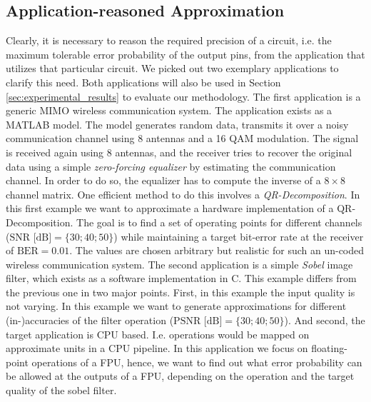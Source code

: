 \documentclass[conference]{IEEEtran}
\begin{document}
\subsection{Application-reasoned Approximation}
\label{subsec:application_reasoned}
Clearly, it is necessary to reason the required precision of a circuit, i.e. the maximum tolerable error probability of the output pins, from the application that utilizes that particular circuit. We picked out two exemplary applications to clarify this need. Both applications will also be used in Section \ref{sec:experimental_results} to evaluate our methodology. The first application is a generic MIMO wireless communication system. The application exists as a MATLAB model. The model generates random data, transmits it over a noisy communication channel using 8 antennas and a 16 QAM modulation. The signal is received again using 8 antennas, and the receiver tries to recover the original data using a simple \emph{zero-forcing equalizer} by estimating the communication channel. In order to do so, the equalizer has to compute the inverse of a $8\times8$ channel matrix. One efficient method to do this involves a \emph{QR-Decomposition}. In this first example we want to approximate a hardware implementation of a QR-Decomposition. The goal is to find a set of operating points for different channels (\mbox{$\textrm{SNR [dB]} = \{30; 40; 50\}$}) while maintaining a target bit-error rate at the receiver of \mbox{$\textrm{BER}=0.01$}. The values are chosen arbitrary but realistic for such an un-coded wireless communication system. The second application is a simple \emph{Sobel} image filter, which exists as a software implementation in C. This example differs from the previous one in two major points. First, in this example the input quality is not varying. In this example we want to generate approximations for different (in-)accuracies of the filter operation (\mbox{$\textrm{PSNR [dB]} = \{30; 40; 50\}$}). And second, the target application is CPU based. I.e. operations would be mapped on approximate units in a CPU pipeline. In this application we focus on floating-point operations of a FPU, hence, we want to find out what error probability can be allowed at the outputs of a FPU, depending on the operation and the target quality of the sobel filter.
\end{document}
